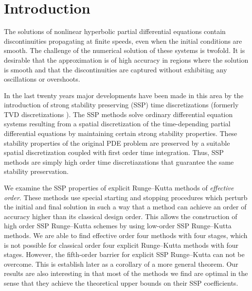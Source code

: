 \section{Introduction}\label{sec:Intro}

\quad The solutions of nonlinear hyperbolic partial differential equations contain discontinuities propagating at finite speeds, even when the initial conditions are smooth. The challenge of the numerical solution of these systems is twofold. It is desirable that the approximation is of high accuracy in regions where the solution is smooth and that the discontinuities are captured without exhibiting any oscillations or overshoots.

In the last twenty years major developments have been made in this area by the introduction of strong stability preserving (SSP) time discretizations (formerly TVD discretizations \cite{Gottlieb1998}). The SSP methods solve ordinary differential equation systems resulting from a spatial discretization of the time-depending partial differential equations by maintaining certain strong stability properties. These stability properties of the original PDE problem are preserved by a suitable spatial discretization coupled with first order time integration. Thus, SSP methods are simply high order time discretiazations that guarantee the same stability preservation.


We examine the SSP properties of explicit Runge--Kutta methods of \emph{effective order}. These methods use special starting and stopping procedures which perturb the initial and final solution in such a way that a method can achieve an order of accuracy higher than its classical design order. This allows the construction of high order SSP Runge--Kutta schemes by using low-order SSP Runge--Kutta methods. We are able to find effective order four methods with four stages, which is not possible for classical order four explicit Runge--Kutta methods with four stages. However, the fifth-order barrier for explicit SSP Runge--Kutta can not be overcome. This is  establish later as a corollary of a more general theorem. Our results are also interesting in that most of the methods we find are optimal in the sense that they achieve the theoretical upper bounds on their SSP coefficients.

